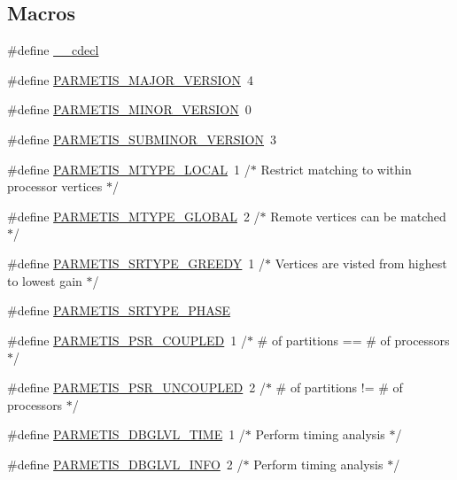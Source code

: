 \subsection*{Macros}
\begin{DoxyCompactItemize}
\item 
\#define \hyperlink{a00840_a238347d7669f8f1e9c83bfe63a2730c4}{\+\_\+\+\_\+cdecl}
\item 
\#define \hyperlink{a00840_aa48ba987f3ff8d56871c3fb2bed6d314}{P\+A\+R\+M\+E\+T\+I\+S\+\_\+\+M\+A\+J\+O\+R\+\_\+\+V\+E\+R\+S\+I\+ON}~4
\item 
\#define \hyperlink{a00840_ad51bc57fc5083572dd337e204de625ff}{P\+A\+R\+M\+E\+T\+I\+S\+\_\+\+M\+I\+N\+O\+R\+\_\+\+V\+E\+R\+S\+I\+ON}~0
\item 
\#define \hyperlink{a00840_a1d99bc97bff12181a8ad9588069a1f41}{P\+A\+R\+M\+E\+T\+I\+S\+\_\+\+S\+U\+B\+M\+I\+N\+O\+R\+\_\+\+V\+E\+R\+S\+I\+ON}~3
\item 
\#define \hyperlink{a00840_a8688bf16d43a979a690cef51e4e57d48}{P\+A\+R\+M\+E\+T\+I\+S\+\_\+\+M\+T\+Y\+P\+E\+\_\+\+L\+O\+C\+AL}~1    /$\ast$ Restrict matching to within processor vertices $\ast$/
\item 
\#define \hyperlink{a00840_af25d77131e25b013f79a5a7644c5792f}{P\+A\+R\+M\+E\+T\+I\+S\+\_\+\+M\+T\+Y\+P\+E\+\_\+\+G\+L\+O\+B\+AL}~2    /$\ast$ Remote vertices can be matched $\ast$/
\item 
\#define \hyperlink{a00840_ac0d490032ded504c8022884265a11546}{P\+A\+R\+M\+E\+T\+I\+S\+\_\+\+S\+R\+T\+Y\+P\+E\+\_\+\+G\+R\+E\+E\+DY}~1    /$\ast$ Vertices are visted from highest to lowest gain $\ast$/
\item 
\#define \hyperlink{a00840_a614e5181ee41475b1ffde007468e0526}{P\+A\+R\+M\+E\+T\+I\+S\+\_\+\+S\+R\+T\+Y\+P\+E\+\_\+P\+H\+A\+SE}
\item 
\#define \hyperlink{a00840_a4703e7e2556a1a53794358fc85b8c103}{P\+A\+R\+M\+E\+T\+I\+S\+\_\+\+P\+S\+R\+\_\+\+C\+O\+U\+P\+L\+ED}~1    /$\ast$ \# of partitions == \# of processors $\ast$/
\item 
\#define \hyperlink{a00840_a0462a45a6c6bafa94c1327994fd3d9bd}{P\+A\+R\+M\+E\+T\+I\+S\+\_\+\+P\+S\+R\+\_\+\+U\+N\+C\+O\+U\+P\+L\+ED}~2    /$\ast$ \# of partitions != \# of processors $\ast$/
\item 
\#define \hyperlink{a00840_a83335527ec28434827ba22669c20f519}{P\+A\+R\+M\+E\+T\+I\+S\+\_\+\+D\+B\+G\+L\+V\+L\+\_\+\+T\+I\+ME}~1      /$\ast$ Perform timing analysis $\ast$/
\item 
\#define \hyperlink{a00840_ad4d113bb626ca386dfbb86d6730c9d0d}{P\+A\+R\+M\+E\+T\+I\+S\+\_\+\+D\+B\+G\+L\+V\+L\+\_\+\+I\+N\+FO}~2      /$\ast$ Perform timing analysis $\ast$/

\end{DoxyCompactItemize}
